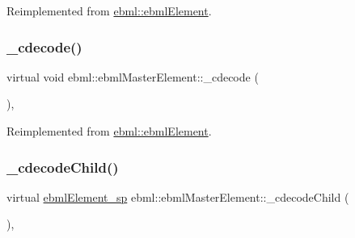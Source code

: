 Reimplemented from \mbox{\hyperlink{classebml_1_1ebmlElement_a685441a87d36f6cfc844a72068b32c18}{ebml\+::ebml\+Element}}.

\mbox{\label{classebml_1_1ebmlMasterElement_a4cc06e13186cec1fb00fca66b4a1f265}} 
\subsubsection{\texorpdfstring{\+\_\+cdecode()}{\_cdecode()}\hspace{0.1cm}{\footnotesize\ttfamily [2/2]}}
{\footnotesize\ttfamily virtual void ebml\+::ebml\+Master\+Element\+::\+\_\+cdecode (\begin{DoxyParamCaption}\item[{const \mbox{\hyperlink{classebml_1_1parseFile}{parse\+File}} \&}]{ }\end{DoxyParamCaption})\hspace{0.3cm}{\ttfamily [protected]}, {\ttfamily [virtual]}}



Reimplemented from \mbox{\hyperlink{classebml_1_1ebmlElement_ab35f8705d2eec94a8af453cac0a53341}{ebml\+::ebml\+Element}}.

\mbox{\label{classebml_1_1ebmlMasterElement_a5343fa61c506f60649f433a6b92f8f56}} 
\subsubsection{\texorpdfstring{\+\_\+cdecode\+Child()}{\_cdecodeChild()}\hspace{0.1cm}{\footnotesize\ttfamily [1/2]}}
{\footnotesize\ttfamily virtual \mbox{\hyperlink{namespaceebml_adad533b7705a16bb360fe56380c5e7be}{ebml\+Element\+\_\+sp}} ebml\+::ebml\+Master\+Element\+::\+\_\+cdecode\+Child (\begin{DoxyParamCaption}\item[{const \mbox{\hyperlink{classebml_1_1parseString}{parse\+String}} \&}]{ }\end{DoxyParamCaption})\hspace{0.3cm}{\ttfamily [protected]}, {\ttfamily [virtual]}}

